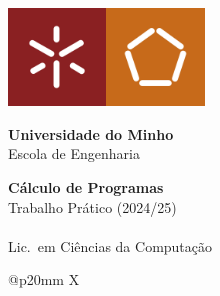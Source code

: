 \begin{titlepage}
\includegraphics[width=26mm]{cp2425t_media/UM.jpg}\includegraphics[width=26mm]{cp2425t_media/EE.jpg}

\vspace{7mm}
\leading{17pt}
{\Large
\textbf{Universidade do Minho}
\\
{\selectfont
Escola de Engenharia
}}

\vspace{50mm}
\leading{27pt}
{\huge
\textbf{Cálculo de Programas}
\\
Trabalho Prático (2024/25)}
\\
%
\\
{\LARGE
Lic.\ em Ciências da Computação}

\vspace{50mm}
\leading{15pt}
{\Large
\begin{tabularx}{\textwidth}{@{}p{20mm} X}
     \\
     \\
    \thestudentA \\
    \thestudentB \\
    \thestudentC \\
\end{tabularx}
}

\vspace*{\fill}
{\large \myear}
\end{titlepage}
